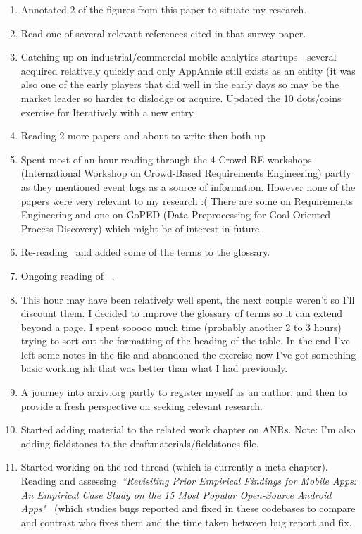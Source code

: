 \begin{enumerate}
    \item Annotated 2 of the figures from this paper to situate my research.
    \item Read one of several relevant references cited in that survey paper.
    \item Catching up on industrial/commercial mobile analytics startups - several acquired relatively quickly and only AppAnnie still exists as an entity (it was also one of the early players that did well in the early days so may be the market leader so harder to dislodge or acquire. Updated the 10 dots/coins exercise for Iteratively with a new entry.
    \item Reading 2 more papers and about to write then both up~\citep{linares2015_mining_android_app_execution_traces_etc, martin2017_survey_in_app_store_analysis_for_software_engineering_IEEE_edition}
    \item Spent most of an hour reading through the 4 Crowd RE workshops (International Workshop on Crowd-Based Requirements Engineering) partly as they mentioned event logs as a source of information. However none of the papers were very relevant to my research :( There are some on Requirements Engineering and one on GoPED (Data Preprocessing for Goal-Oriented Process Discovery) which might be of interest in future.
    \item Re-reading~\citep{maalej2016_towards_data_driven_requirements_engineering} and added some of the terms to the glossary.
    \item Ongoing reading of ~\citep{maalej2016_towards_data_driven_requirements_engineering}.
    \item This hour may have been relatively well spent, the next couple weren't so I'll discount them. I decided to improve the glossary of terms so it can extend beyond a page. I spent sooooo much time (probably another 2 to 3 hours) trying to sort out the formatting of the heading of the table. In the end I've left some notes in the file and abandoned the exercise now I've got something basic working ish that was better than what I had previously. 
    \item A journey into \url{arxiv.org} partly to register myself as an author, and then to provide a fresh perspective on seeking relevant research.
    \item Started adding material to the related work chapter on ANRs. Note: I'm also adding fieldstones to the draftmaterials/fieldstones file.
    \item Started working on the red thread (which is currently a meta-chapter). Reading and assessing~\emph{``Revisiting Prior Empirical Findings for Mobile Apps: An Empirical Case Study on the 15 Most Popular Open-Source Android Apps"}~\citep{syer2013_empirical_findings_for_mobile_apps} (which studies bugs reported and fixed in these codebases to compare and contrast who fixes them and the time taken between bug report and fix.

\end{enumerate}
